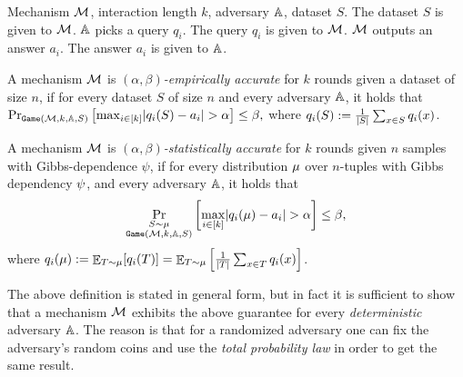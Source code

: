 \documentclass[12pt,a4paper,oneside,onecolumn]{book}
\begin{document}
\begin{algorithm}[tb]
   \caption{$\texttt{Game}(\mechanism,k,\adversary,S)$}
  \label{alg:adapt-pop-game}
\begin{algorithmic}
    Mechanism $\mathcal{M}$, interaction length $k$, adversary $\mathbb{A}$, dataset $S$.
   \State The dataset $S$ is given to $\mathcal{M}$.
   \State $\mathbb{A}$ picks a query $q_i$.
   \State The query $q_i$ is given to $\mathcal{M}$.
   \State $\mathcal{M}$ outputs an answer $a_i$.
   \State The answer $a_i$ is given to $\mathbb{A}$.
   \EndFor
\end{algorithmic}
\end{algorithm}


\begin{definition}
  A mechanism $\mathcal{M}$ is {\em $(\alpha,\beta)$-empirically accurate} for $k$ rounds given a dataset of size $n$,
  if for every dataset $S$ of size $n$ and every adversary $\mathbb{A}$, it holds that 
  $
    \Pr_{\texttt{Game}(\mathcal{M},k,\mathbb{A},S)}\left[
      \max_{i\in [k]} \lvert q_i(S) - a_i\rvert > \alpha
    \right] \leq \beta,
  $ 
  where $q_i(S) := \frac{1}{|S|}\sum_{x\in S}q_i(x)$.
\end{definition}


\begin{definition}\label{def:adaptiveaccuracy}
  A mechanism $\mathcal{M}$ is {\em $(\alpha,\beta)$-statistically accurate} for $k$ rounds given $n$ samples with Gibbs-dependence $\psi$, 
  if for every distribution $\mu$ over $n$-tuples with Gibbs dependency $\psi$, and every adversary $\mathbb{A}$, 
  it holds that 
  \[
    \Pr_{\substack{S\sim\mu\\\texttt{Game}(\mathcal{M},k,\mathbb{A},S)}}\left[
      \max_{i\in [k]} \lvert q_i(\mu) - a_i\rvert > \alpha
    \right] \leq \beta,
  \]
  where 
  $q_i(\mu) := \mathop{\mathbb{E}}_{T\sim\mu}[q_i(T)]=\mathop{\mathbb{E}}_{T\sim\mu}\left[\frac{1}{|T|}\sum_{x\in T}q_i(x)\right]$.
\end{definition}

\begin{remark}
\label{rem:det-is-suff}
    The above definition is stated in general form, but in fact it is sufficient to show that a mechanism $\mathcal{M}$ exhibits the above guarantee for every \emph{deterministic} adversary $\mathbb{A}$. The reason is that for a randomized adversary one can fix the adversary's random coins and use the \emph{total probability law} in order to get the same result. 
\end{remark}
\end{document}
